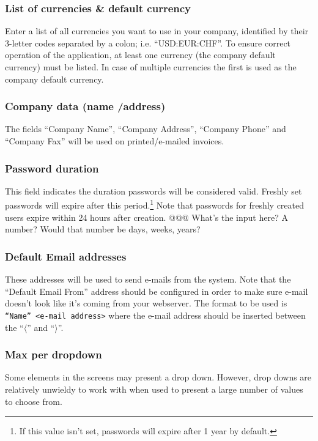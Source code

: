 \documentclass[10pt,A4]{book}
\begin{document}
\subsubsection{List of currencies \& default currency}

Enter a list of all currencies you want
to use in your company, identified by their 3-letter codes separated by a colon; i.e.
``USD:EUR:CHF''. To ensure correct operation of the application, at least one currency
(the company default currency) must be listed. In case of multiple currencies the first
is used as the company default currency.
\subsubsection{Company data (name /address)}

The fields ``Company Name'', ``Company Address'',
``Company Phone'' and ``Company Fax'' will be used on printed/e-mailed invoices.

\subsubsection{Password duration} This field indicates the duration passwords will be considered valid. Freshly set passwords will expire after this period.\footnote{If this value isn't set, passwords will expire after 1 year by default.} Note that passwords for freshly
created users expire within 24 hours after creation. @@@ What's the input here? A number? Would that number be days, weeks, years?


\subsubsection{Default Email addresses}

These addresses will be used to send e-mails from the system.
Note that the ``Default Email From'' address should be configured in order to make sure
e-mail doesn't look like it's coming from your webserver. The format to be used is \texttt{``Name'' <e-mail address>} where the e-mail address should be inserted between the
``$\langle$'' and ``$\rangle$''.

\subsubsection{Max per dropdown}

Some elements in the screens may present a drop down. However, drop downs are
relatively unwieldy to work with when used to present a large number of values
to choose from.
\end{document}

